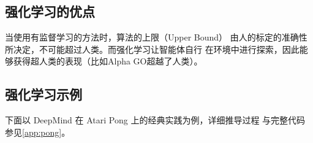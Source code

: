 \subsection{强化学习的优点}

\indent 当使用有监督学习的方法时，算法的上限（Upper Bound）
由人的标定的准确性所决定，不可能超过人类。而强化学习让智能体自行
在环境中进行探索，因此能够获得超人类的表现（比如Alpha GO超越了人类）。

\subsection{强化学习示例}

下面以 DeepMind 在 Atari Pong 上的经典实践为例，详细推导过程
与完整代码参见\cref{app:pong}。


